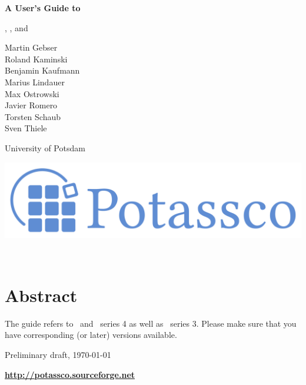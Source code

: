 \thispagestyle{empty}
\bigskip
\noindent
{\Huge\bf
A User's Guide to 
\par
\bigskip
\noindent
\gringo, \clasp, and \clingo}

\bigskip
\bigskip

\noindent
Martin Gebser \\
Roland Kaminski \\
Benjamin Kaufmann \\
Marius Lindauer \\
Max Ostrowski \\
Javier Romero \\
Torsten Schaub \\
Sven Thiele 
\par
\bigskip
\noindent
University of Potsdam

\vfill

\noindent
\includegraphics[width=\textwidth]{potassco_logo_blue}
\bigskip

\newpage
\thispagestyle{empty}\ 
\newpage
\thispagestyle{empty}\ 
\section*{Abstract}


\bigskip
\noindent
The guide refers to \gringo\ and \clingo\ series 4 as well as \clasp\ series 3.
Please make sure that you have corresponding (or later) versions available.

\vfill

\begin{center}
  
\end{center}

\vfill

\noindent
Preliminary draft, \today\ %

\bigskip
\noindent
{\LARGE\bf\url{http://potassco.sourceforge.net}}





